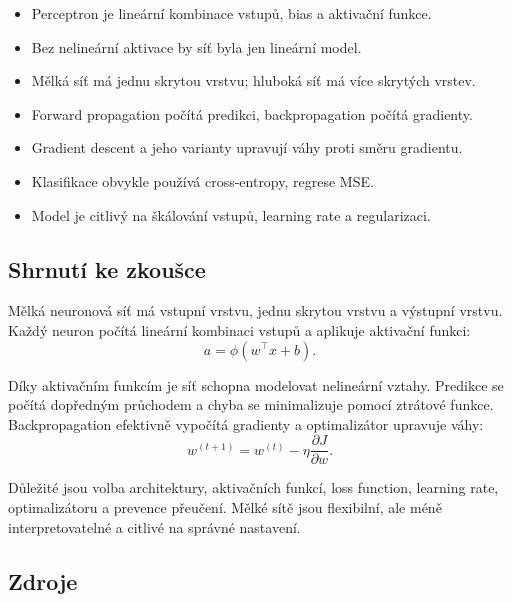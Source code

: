 \begin{itemize}
    \item Perceptron je lineární kombinace vstupů, bias a aktivační funkce.
    \item Bez nelineární aktivace by síť byla jen lineární model.
    \item Mělká síť má jednu skrytou vrstvu; hluboká síť má více skrytých vrstev.
    \item Forward propagation počítá predikci, backpropagation počítá gradienty.
    \item Gradient descent a jeho varianty upravují váhy proti směru gradientu.
    \item Klasifikace obvykle používá cross-entropy, regrese MSE.
    \item Model je citlivý na škálování vstupů, learning rate a regularizaci.
\end{itemize}

\subsection{Shrnutí ke zkoušce}

Mělká neuronová síť má vstupní vrstvu, jednu skrytou vrstvu a výstupní vrstvu. Každý neuron počítá lineární
kombinaci vstupů a aplikuje aktivační funkci:
\[
a=\phi(w^\top x+b).
\]

Díky aktivačním funkcím je síť schopna modelovat nelineární vztahy. Predikce se počítá dopředným průchodem
a chyba se minimalizuje pomocí ztrátové funkce. Backpropagation efektivně vypočítá gradienty a optimalizátor
upravuje váhy:
\[
w^{(t+1)}
=
w^{(t)}
-
\eta
\frac{\partial J}{\partial w}.
\]

Důležité jsou volba architektury, aktivačních funkcí, loss function, learning rate, optimalizátoru a prevence
přeučení. Mělké sítě jsou flexibilní, ale méně interpretovatelné a citlivé na správné nastavení.

\subsection{Zdroje}

